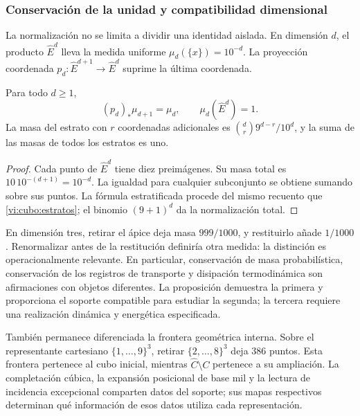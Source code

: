 

\subsubsection{Conservación de la unidad y compatibilidad dimensional}

La normalización no se limita a dividir una identidad aislada. En dimensión
\(d\), el producto \(\widehat E^d\) lleva la medida uniforme
\(\mu_d(\{x\})=10^{-d}\). La proyección coordenada
\(p_d:\widehat E^{d+1}\to\widehat E^d\) suprime la última coordenada.

\begin{proposition}
Para todo \(d\geq1\),
\[
 (p_d)_*\mu_{d+1}=\mu_d,
 \qquad \mu_d(\widehat E^d)=1.
\]
La masa del estrato con \(r\) coordenadas adicionales es
\(\binom dr9^{d-r}/10^d\), y la suma de las masas de todos los estratos
es uno.
\end{proposition}
\begin{proof}
Cada punto de \(\widehat E^d\) tiene diez preimágenes. Su masa total es
\(10\,10^{-(d+1)}=10^{-d}\). La igualdad para cualquier subconjunto
se obtiene sumando sobre sus puntos. La fórmula estratificada procede
del mismo recuento que \eqref{vi:cubo:estratos}; el binomio
\((9+1)^d\) da la normalización total.
\end{proof}

En dimensión tres, retirar el ápice deja masa \(999/1000\), y
restituirlo añade \(1/1000\). Renormalizar antes de la restitución
definiría otra medida: la distinción es operacionalmente relevante.
En particular, conservación de masa probabilística, conservación de los
registros de transporte y disipación termodinámica son afirmaciones con
objetos diferentes. La proposición demuestra la primera y proporciona el
soporte compatible para estudiar la segunda; la tercera requiere una
realización dinámica y energética especificada.

También permanece diferenciada la frontera geométrica interna.
Sobre el representante cartesiano \(\{1,\ldots,9\}^3\), retirar
\(\{2,\ldots,8\}^3\) deja \(386\) puntos. Esta frontera pertenece al
cubo inicial, mientras \(\widehat C\setminus C\) pertenece a su
ampliación. La completación cúbica, la expansión posicional de base mil y
la lectura de incidencia excepcional comparten datos del soporte;
sus mapas respectivos determinan qué información de esos datos utiliza
cada representación.
